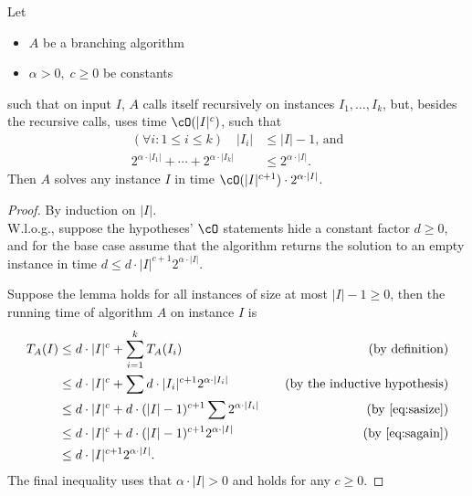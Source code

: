 \begin{frame}[allowframebreaks]

\begin{lemma} \label{lem:simpleanalysis}
Let
\begin{itemize}
 \item $A$ be a branching algorithm
 \item $\alpha > 0, \; c \ge 0$ be constants
\end{itemize}
such that
on input $I$, $A$ calls itself recursively on instances $I_1,\ldots,I_k$, but, besides the recursive calls, uses time $\cO(|I|^c)$, such that
\begin{align}
(\forall i: 1 \le i \le k) \quad |I_i| & \leq |I|-1 \text{, and}  \label{eq:sasize}
  \\
2^{\alpha \cdot |I_1|} + \cdots + 2^{\alpha \cdot |I_k|} & \leq 2^{\alpha \cdot |I|} . \label{eq:sagain}
\end{align}
Then $A$ solves any instance $I$
in time $\cO(|I|^{c+1}) \cdot 2^{\alpha \cdot |I|}$.
\end{lemma}

\framebreak

\begin{proof}
By induction on $|I|$.\\
W.l.o.g., suppose the
hypotheses' $\cO$ statements hide a constant factor $d\ge 0$, and for the base case assume that
the algorithm returns the solution to an empty instance in time $d \le d\cdot |I|^{c+1} 2^{\alpha \cdot |I|}$.

Suppose the lemma holds for all instances of size at most $|I|-1\ge 0$, then the running time of algorithm $A$ on instance $I$ is
{\allowdisplaybreaks
\begin{align*}
T_A(I) & \le d\cdot |I|^c + \sum_{i=1}^k T_A(I_i) 
  &\text{\quad (by definition)}
\\ &\le d\cdot |I|^c + \sum d\cdot |I_i|^{c+1} 2^{\alpha \cdot |I_i|} 
  &\text{\quad (by the inductive hypothesis)}
\\ &\le d\cdot |I|^c + d\cdot (|I|-1)^{c+1} \sum 2^{\alpha \cdot |I_i|}
  &\text{\quad (by \eqref{eq:sasize})}
\\ &\le d\cdot |I|^c + d\cdot (|I|-1)^{c+1} 2^{\alpha \cdot |I|} 
  &\text{\quad (by \eqref{eq:sagain})}
\\ &\le d\cdot |I|^{c+1} 2^{\alpha \cdot |I|} .
\end{align*}}
The final inequality uses that $\alpha \cdot |I| > 0$ and holds for any $c \geq 0$.
\end{proof}

\end{frame}

